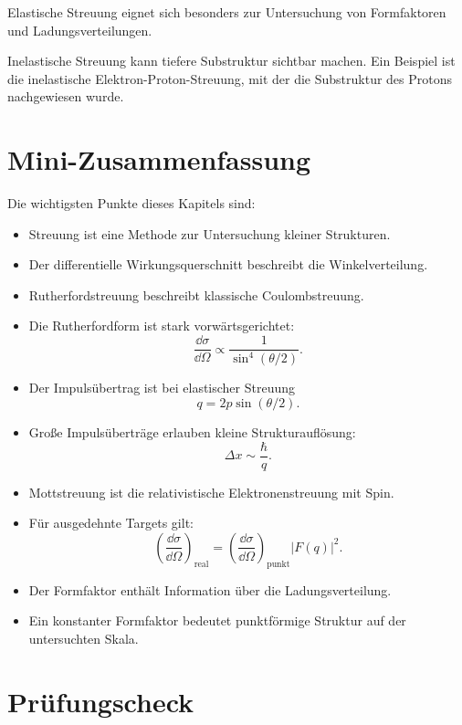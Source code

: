 \begin{conceptbox}
Elastische Streuung eignet sich besonders zur Untersuchung von Formfaktoren und
Ladungsverteilungen.

Inelastische Streuung kann tiefere Substruktur sichtbar machen.
Ein Beispiel ist die inelastische Elektron-Proton-Streuung, mit der die Substruktur
des Protons nachgewiesen wurde.
\end{conceptbox}

\section{Mini-Zusammenfassung}

\begin{notebox}
Die wichtigsten Punkte dieses Kapitels sind:
\begin{itemize}
    \item Streuung ist eine Methode zur Untersuchung kleiner Strukturen.
    \item Der differentielle Wirkungsquerschnitt beschreibt die Winkelverteilung.
    \item Rutherfordstreuung beschreibt klassische Coulombstreuung.
    \item Die Rutherfordform ist stark vorwärtsgerichtet:
    \[
        \frac{\dd\sigma}{\dd\Omega}
        \propto
        \frac{1}{\sin^4(\theta/2)}.
    \]
    \item Der Impulsübertrag ist bei elastischer Streuung
    \[
        q=2p\sin(\theta/2).
    \]
    \item Große Impulsüberträge erlauben kleine Strukturauflösung:
    \[
        \Delta x\sim \frac{\hbar}{q}.
    \]
    \item Mottstreuung ist die relativistische Elektronenstreuung mit Spin.
    \item Für ausgedehnte Targets gilt:
    \[
        \left(\frac{\dd\sigma}{\dd\Omega}\right)_{\mathrm{real}}
        =
        \left(\frac{\dd\sigma}{\dd\Omega}\right)_{\mathrm{punkt}}
        |F(q)|^2.
    \]
    \item Der Formfaktor enthält Information über die Ladungsverteilung.
    \item Ein konstanter Formfaktor bedeutet punktförmige Struktur auf der untersuchten Skala.
\end{itemize}
\end{notebox}

\section{Prüfungscheck}

